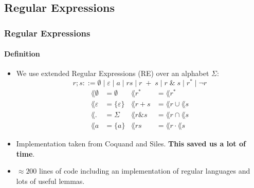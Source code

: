 \documentclass{beamer}
\begin{document}
\subsection{Regular Expressions}
\begin{frame}[fragile]
    \frametitle{Regular Expressions}
    \framesubtitle{Definition}

    \begin{itemize}
        \item 
            We use extended Regular Expressions (RE) over an alphabet $\Sigma$:
            \begin{equation*}    
                r; s ::= \emptyset \; | \; \varepsilon \; | \;  a \; | \; rs \; | \;  r \;  + \; s \; | \; r \; \& \; s \; |\; r^* \; | \; \neg r
            \end{equation*}\vspace{-2em}%
            \begin{align*}%
                \lang{\emptyset} & = \emptyset
                & 
                \lang{r^*} & = \lang{r}^* \\
                \lang{\varepsilon} & = \{\varepsilon\}
                & 
                \lang{r + s} & = \lang{r} \cup \lang{s} \\
                \lang{.} & = \Sigma
                & 
                \lang{r \& s} & = \lang{r} \cap \lang{s} \\
                \lang{a} & = \{a\}
                &
                \lang{r s} & = \lang{r} \cdot \lang{s}
            \end{align*}
        \item Implementation taken from Coquand and Siles.
            \textbf{This saved us a lot of time}.
        \item $\approx 200$ lines of code including an implementation of regular languages and lots of useful lemmas.
    \end{itemize}

\end{frame}
\end{document}
